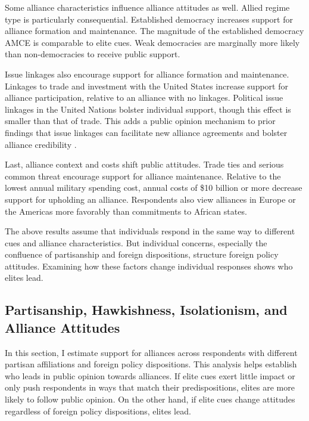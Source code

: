 \documentclass[12pt]{article}
\begin{document}
Some alliance characteristics influence alliance attitudes as well. 
Allied regime type is particularly consequential. 
Established democracy increases support for alliance formation and maintenance.
The magnitude of the established democracy AMCE is comparable to elite cues.   
Weak democracies are marginally more likely than non-democracies to receive public support.


Issue linkages also encourage support for alliance formation and maintenance. 
Linkages to trade and investment with the United States increase support for alliance participation, relative to an alliance with no linkages. 
Political issue linkages in the United Nations bolster individual support, though this effect is smaller than that of trade. 
This adds a public opinion mechanism to prior findings that issue linkages can facilitate new alliance agreements \citep{Poast2012} and bolster alliance credibility \citep{Poast2013}. 


Last, alliance context and costs shift public attitudes. 
Trade ties and serious common threat encourage support for alliance maintenance. 
Relative to the lowest annual military spending cost, annual costs of \$10 billion or more decrease support for upholding an alliance.  
Respondents also view alliances in Europe or the Americas more favorably than commitments to African states. 


The above results assume that individuals respond in the same way to different cues and alliance characteristics. 
But individual concerns, especially the confluence of partisanship and foreign dispositions, structure foreign policy attitudes.
Examining how these factors change individual responses shows who elites lead.  



\subsection{Partisanship, Hawkishness, Isolationism, and Alliance Attitudes}



In this section, I estimate support for alliances across respondents with different partisan affiliations and foreign policy dispositions.  
This analysis helps establish who leads in public opinion towards alliances. 
If elite cues exert little impact or only push respondents in ways that match their predispositions, elites are more likely to follow public opinion. 
On the other hand, if elite cues change attitudes regardless of foreign policy dispositions, elites lead. 
\end{document}
